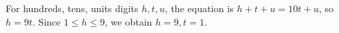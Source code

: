 For hundreds, tens, units digits $h,t,u$, the equation is $h+t+u=10t+u$, so $h=9t$. Since $1\le h\le9$, we obtain $h=9,t=\boxed1$.
